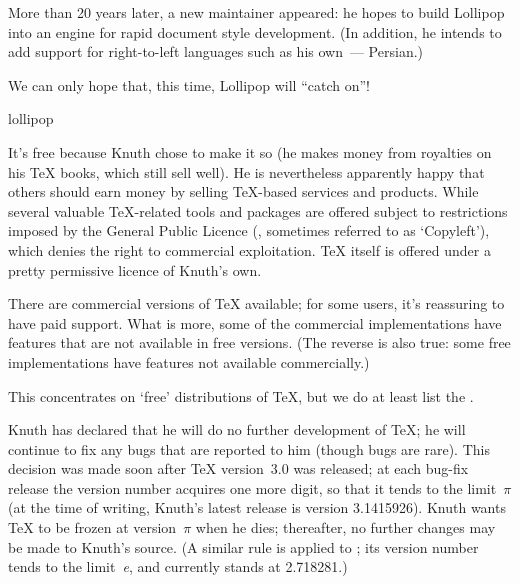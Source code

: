 More than 20 years later, a new maintainer appeared: he hopes to build
Lollipop into an engine for rapid document style development.  (In
addition, he intends to add support for right-to-left languages such
as his own~--- Persian.)

We can only hope that, this time, Lollipop will ``catch on''!
\begin{ctanrefs}
\item[lollipop]
\end{ctanrefs}


It's free because Knuth chose to make it so (he makes money from
royalties on his \TeX{} books, which still sell well).  He is
nevertheless apparently happy that others should earn money by selling
\TeX{}-based services and products. While several valuable
\TeX{}-related tools and packages are offered subject to restrictions
imposed by the  General Public Licence (,
sometimes referred to as `Copyleft'), which denies the right to
commercial exploitation.  \TeX{} itself is offered under a pretty
permissive licence of Knuth's own.

There are commercial versions of \TeX{} available; for some users,
it's reassuring to have paid support.  What is more, some of the
commercial implementations
have features that are not available in free versions.  (The
reverse is also true: some free implementations have features
not available commercially.)

This  concentrates on `free' distributions of \TeX{}, but we
do at least list the .


Knuth has declared that he will do no further development of \TeX{};
he will continue to fix any bugs that are reported to him (though
bugs are rare).  This decision was made soon after
\TeX{} version~3.0 was released; at each bug-fix release
the version number acquires one more digit, so that it tends to the
limit~\ensuremath{\pi} (at the time of writing, Knuth's latest release
is version 3.1415926).  Knuth wants \TeX{} to be frozen at
version~\ensuremath{\pi} when he dies; thereafter, no further changes
may be made to Knuth's source.  (A similar rule is applied to \MF{};
its version number tends to the limit~\emph{e}, and currently
stands at 2.718281.)

